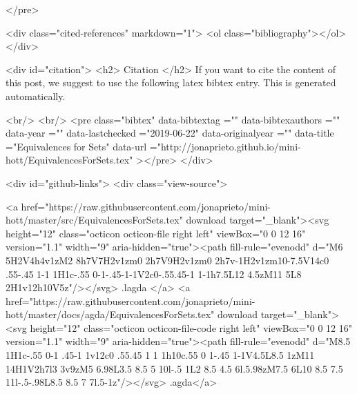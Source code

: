 </pre>


  <div class="cited-references" markdown="1">
  <ol class="bibliography"></ol>
  </div>


  
  <div id="citation">
  <h2> Citation </h2>
  If you want to cite the content of this post,
  we suggest to use the following latex bibtex entry.
  This is generated automatically.

  <br/>
  <br/>
  <pre class="bibtex"
       data-bibtextag =""
       data-bibtexauthors =""
       data-year =""
       data-lastchecked ="2019-06-22"
       data-originalyear =""
       data-title ="Equivalences for Sets"
       data-url ="http://jonaprieto.github.io/mini-hott/EquivalencesForSets.tex"
  ></pre>
  </div>
  

  <div id="github-links">
    <div class="view-source">
      
        <a href="https://raw.githubusercontent.com/jonaprieto/mini-hott/master/src/EquivalencesForSets.tex" download target="_blank"><svg height="12" class="octicon octicon-file right left" viewBox="0 0 12 16" version="1.1" width="9" aria-hidden="true"><path fill-rule="evenodd" d="M6 5H2V4h4v1zM2 8h7V7H2v1zm0 2h7V9H2v1zm0 2h7v-1H2v1zm10-7.5V14c0 .55-.45 1-1 1H1c-.55 0-1-.45-1-1V2c0-.55.45-1 1-1h7.5L12 4.5zM11 5L8 2H1v12h10V5z"/></svg> .lagda </a>
        <a href="https://raw.githubusercontent.com/jonaprieto/mini-hott/master/docs/agda/EquivalencesForSets.tex" download target="_blank"><svg height="12" class="octicon octicon-file-code right left" viewBox="0 0 12 16" version="1.1" width="9" aria-hidden="true"><path fill-rule="evenodd" d="M8.5 1H1c-.55 0-1 .45-1 1v12c0 .55.45 1 1 1h10c.55 0 1-.45 1-1V4.5L8.5 1zM11 14H1V2h7l3 3v9zM5 6.98L3.5 8.5 5 10l-.5 1L2 8.5 4.5 6l.5.98zM7.5 6L10 8.5 7.5 11l-.5-.98L8.5 8.5 7 7l.5-1z"/></svg> .agda</a>
      
